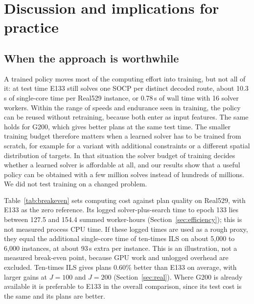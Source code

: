 \documentclass[preprint,12pt,authoryear]{elsarticle}
\begin{document}
\section{Discussion and implications for practice}
\label{sec:discussion}

\subsection{When the approach is worthwhile}

A trained policy moves most of the computing effort into training, but not all of it: at test time E133 still solves one SOCP per distinct decoded route, about 10.3\,s of single-core time per Real529 instance, or 0.78\,s of wall time with 16 solver workers. Within the range of speeds and endurance seen in training, the policy can be reused without retraining, because both enter as input features. The same holds for G200, which gives better plans at the same test time. The smaller training budget therefore matters when a learned solver has to be trained from scratch, for example for a variant with additional constraints or a different spatial distribution of targets. In that situation the solver budget of training decides whether a learned solver is affordable at all, and our results show that a useful policy can be obtained with a few million solves instead of hundreds of millions. We did not test training on a changed problem.

Table~\ref{tab:breakeven} sets computing cost against plan quality on Real529, with E133 as the zero reference. Its logged solver-plus-search time to epoch 133 lies between 127.5 and 154.4 summed worker-hours (Section~\ref{sec:efficiency}); this is not measured process CPU time. If these logged times are used as a rough proxy, they equal the additional single-core time of ten-times ILS on about 5,000 to 6,000 instances, at about 93\,s extra per instance. This is an illustration, not a measured break-even point, because GPU work and unlogged overhead are excluded. Ten-times ILS gives plans 0.60\% better than E133 on average, with larger gains at $J = 100$ and $J = 200$ (Section~\ref{sec:real}). Where G200 is already available it is preferable to E133 in the overall comparison, since its test cost is the same and its plans are better.
\end{document}
